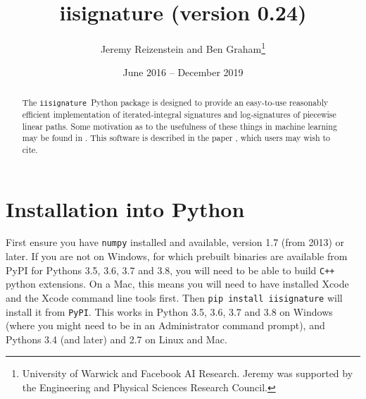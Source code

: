 \documentclass[a4paper]{extarticle}
\begin{document}
\title{iisignature (version 0.24)}
\author{Jeremy Reizenstein %
and
Ben Graham\thanks{University of Warwick and Facebook AI Research. Jeremy was supported by the Engineering and Physical Sciences Research Council.}}
\date{June 2016 -- December 2019}
\maketitle

\def\ii{{\texttt{iisignature}}}
\def\pypi{{\texttt{PyPI}}}
\def\numpy{{\texttt{numpy}}}
\def\scipy{{\texttt{scipy}}}
\def\i#1{\index{#1@\texttt{#1}}}
\def \hilite#1{\underline{\color{blue}\textbf{#1}}}

\begin{abstract}
The \ii\ Python package is designed to provide an easy-to-use reasonably efficient implementation of iterated-integral signatures and log-signatures of piecewise linear paths. Some motivation as to the usefulness of these things in machine learning may be found in \cite{OxSigIntro}.
This software is described in the paper \cite{iisigPaper}, which users may wish to cite.
\end{abstract}
\begin{minipage}{0.6\textwidth}
\tableofcontents
\end{minipage}
\section{Installation into Python}
First ensure you have \verb|numpy| installed and available, version 1.7 (from 2013) or later. If you are not on Windows, for which prebuilt binaries are available from PyPI for Pythons 3.5, 3.6, 3.7 and 3.8, you will need to be able to build \verb|C++| python extensions.
On a Mac, this means you will need to have installed Xcode and the Xcode command line tools first.
Then \verb|pip install iisignature| will install it from \pypi. This works in Python 3.5, 3.6, 3.7 and 3.8 on Windows (where you might need to be in an Administrator command prompt), and Pythons 3.4 (and later) and 2.7 on Linux and Mac.
\end{document}
